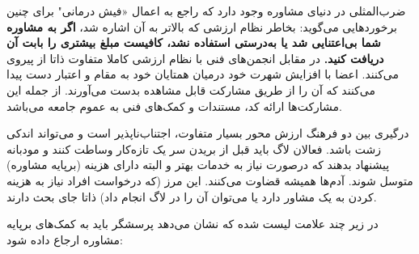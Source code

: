 ضرب‌المثلی در دنیای مشاوره وجود دارد که راجع به اعمال «فیش درمانی"
برای چنین برخورد‌هایی می‌گوید: بخاطر نظام ارزشی که بالاتر به آن اشاره شد،
{\bfseries
اگر به مشاوره شما بی‌اعتنایی شد یا به‌درستی استفاده نشد، کافیست
مبلغ بیشتری را بابت آن دریافت کنید.
}
در مقابل انجمن‌های فنی با نظام ارزشی کاملا متفاوت
ذاتا از
پیروی می‌کنند.
اعضا با افزایش شهرت خود درمیان همتایان خود به مقام و اعتبار
دست پیدا می‌کنند که آن را از طریق مشارکت قابل مشاهده بدست می‌آورند.
از جمله این مشارکت‌ها ارائه کد، مستندات و کمک‌های فنی به عموم جامعه می‌باشد.

درگیری بین دو فرهنگ ارزش محور بسیار متفاوت، اجتناب‌ناپذیر است
و می‌تواند اندکی زشت باشد.
فعالان لاگ باید قبل از بریدن سر یک تازه‌کار وساطت کنند
و مودبانه پیشنهاد بدهند که درصورت نیاز به خدمات بهتر
و البته دارای هزینه (برپایه مشاوره) متوسل شوند.
آدم‌ها همیشه قضاوت می‌کنند. این مرز (که درخواست افراد
نیاز به هزینه کردن به یک مشاور دارد یا می‌توان آن را در
لاگ انجام داد) ذاتا جای بحث دارند.

در زیر چند علامت لیست شده که نشان می‌دهد پرسشگر باید به
کمک‌های برپایه مشاوره ارجاع داده شود:

